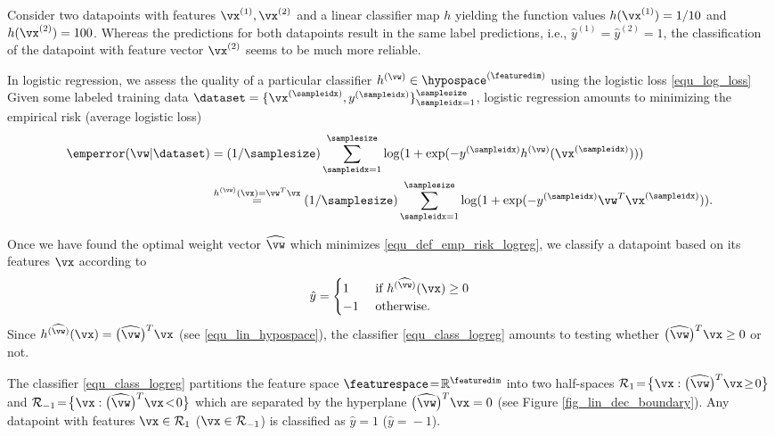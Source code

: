 \documentclass[12pt]{report}
\begin{document}
Consider two datapoints with features $\vx^{(1)}, \vx^{(2)}$ and 
a linear classifier map $h$ yielding the function values $h(\vx^{(1)}) = 1/10$ 
and $h(\vx^{(2)}) = 100$. Whereas the predictions for both datapoints result 
in the same label predictions, i.e., $\hat{y}^{(1)}\!=\!\hat{y}^{(2)}\!=\!1$, the 
classification of the datapoint with feature vector $\vx^{(2)}$ seems to be 
much more reliable. 

In logistic regression, we assess the quality of a particular 
classifier $h^{(\vw)} \in \hypospace^{(\featuredim)}$ using the 
logistic loss \eqref{equ_log_loss} Given some labeled training data 
$\dataset =\{ \vx^{(\sampleidx)},y^{(\sampleidx)} \}_{\sampleidx=1}^{\samplesize}$, 
logistic regression amounts to minimizing the empirical risk (average logistic loss) 
\begin{align} 
\label{equ_def_emp_risk_logreg}
\emperror ( \vw | \dataset ) & = (1/\samplesize) \sum_{\sampleidx=1}^{\samplesize}  \log( 1+ \exp ( - y^{(\sampleidx)} h^{(\vw)}(\vx^{(\sampleidx)}))) \nonumber \\
& \stackrel{h^{(\vw)}(\vx)=\vw^{T} \vx}{=}  (1/\samplesize) \sum_{\sampleidx=1}^{\samplesize} \log( 1+ \exp ( - y^{(\sampleidx)} \vw^{T} \vx^{(\sampleidx)})).
\end{align} 

Once we have found the optimal weight vector $\widehat{\vw}$ which 
minimizes \eqref{equ_def_emp_risk_logreg}, we classify a datapoint 
based on its features $\vx$ according to 
\begin{equation}
\label{equ_class_logreg}
\hat{y} =  \begin{cases} 1 & \mbox{ if } h^{(\widehat{\vw})}(\vx) \geq 0 \\ -1 & \mbox{ otherwise.} \end{cases}
\end{equation} 
Since $h^{(\widehat{\vw})}(\vx) = \big(\widehat{\vw}\big)^{T} \vx$ (see \eqref{equ_lin_hypospace}), 
the classifier \eqref{equ_class_logreg} amounts to testing whether $\big(\widehat{\vw}\big)^{T} \vx \geq 0$ 
or not. 

The classifier \eqref{equ_class_logreg} partitions the feature 
space $\featurespace\!=\!\mathbb{R}^{\featuredim}$ into two 
half-spaces $\mathcal{R}_{1}\!=\!\big\{ \vx: \big(\widehat{\vw}\big)^{T} \vx\!\geq\!0 \big\}$ and 
$\mathcal{R}_{-1}\!=\!\big\{ \vx: \big(\widehat{\vw}\big)^{T} \vx\!<\!0 \big\}$ 
which are separated by the hyperplane $\big(\widehat{\vw}\big)^{T} \vx =0$ 
(see Figure \ref{fig_lin_dec_boundary}). Any datapoint with features 
$\vx \in \mathcal{R}_{1}$ ($\vx \in \mathcal{R}_{-1}$) is classified as 
$\hat{y}\!=\!1$ ($\hat{y}\!=\!-1$). 
\end{document}
